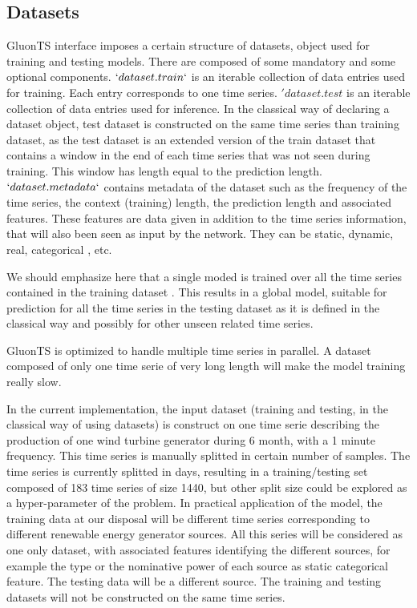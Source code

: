 \documentclass[a4paper, 12pt]{article}
\begin{document}
\subsection{Datasets}

GluonTS interface imposes a certain structure of datasets, object used for training and testing models. There are composed of some mandatory and some optional components.
$`dataset.train`$ is an iterable collection of data entries used for training. Each entry corresponds to one time series.  $'dataset.test$ is an iterable collection of data entries used for inference.
In the classical way of declaring a dataset object, test dataset is constructed on the same time series than training dataset, as  the test dataset is an extended version of the train dataset that contains a window in the end of each time series that was not seen during training. This window has length equal to the prediction length. $`dataset.metadata`$ contains metadata of the dataset such as the frequency of the time series, the context (training) length,  the prediction length and associated features. These features are data given in addition to the time series information, that will also been seen as input by the network. They can be static, dynamic, real, categorical , etc.

We should emphasize here that a single moded is trained over all the time series contained in the training dataset . This results in a global model, suitable for prediction for all the time series in the testing dataset as it is defined in the classical way and possibly for other unseen related time series.

GluonTS is optimized to handle multiple time series in parallel. A dataset composed of only one time serie of very long length will make the model training really slow.

In the current implementation, the input dataset (training and testing, in the classical way of using datasets) is construct on one time serie describing the production of one wind turbine generator during 6 month, with a 1 minute frequency. This time series is manually splitted in certain number of samples. The time series is currently splitted in days, resulting in a training/testing set composed of 183 time series of size 1440, but other split size could be explored as a hyper-parameter of the problem. 
In practical application of the model, the training data at our disposal will be different time series corresponding to different renewable energy generator sources. All this series will be considered as one only dataset, with associated features identifying the different sources, for example the type or the nominative power of each source as static categorical feature.  The testing data will be a different source. The training and testing datasets will not be constructed on the same time series.
\end{document}
